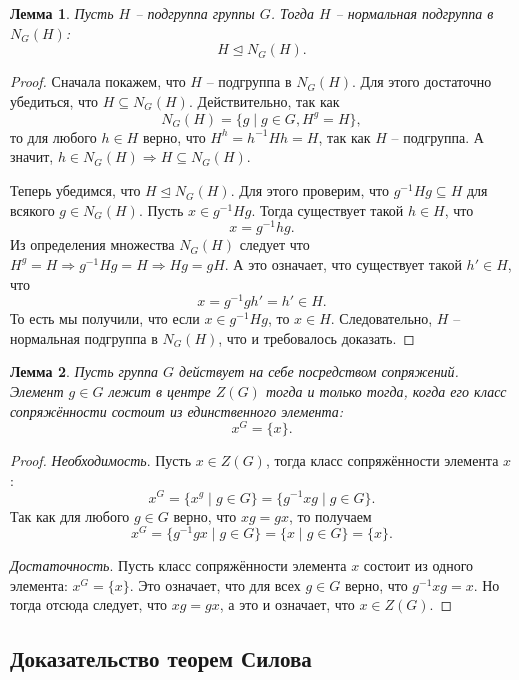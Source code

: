 \documentclass{article}
\newtheorem{lemma}{Лемма}[section]
\begin{document}
\begin{lemma} \label{mtqr}
    Пусть $H$ -- подгруппа группы $G$. Тогда $H$ -- нормальная подгруппа в $N_G(H)$:
    \[
        H \trianglelefteq N_G(H).
    \]
\end{lemma}
\begin{proof}
    Сначала покажем, что $H$ -- подгруппа в $N_G(H)$. Для этого достаточно убедиться, что $H \subseteq N_G(H)$. Действительно, так как $$ N_G(H) = \{ g \mid g \in G, H^g = H \}, $$ то для любого $h \in H$ верно, что $H^h = h^{-1}Hh = H$, так как $H$ -- подгруппа. А значит, $h \in N_G(H) \Rightarrow H \subseteq N_G(H)$.

    Теперь убедимся, что $H \trianglelefteq N_G(H) $. Для этого проверим, что $g^{-1} H g \subseteq H$ для всякого $g \in N_G(H)$. Пусть $x \in g^{-1} H g$. Тогда существует такой $h \in H$, что $$ x = g^{-1} h g. $$ Из определения множества $N_G(H)$ следует что $H^g = H \Rightarrow g^{-1} H g = H \Rightarrow Hg = gH$. А это означает, что существует такой $h' \in H$, что $$ x = g^{-1} g h' = h' \in H. $$
    То есть мы получили, что если $x \in g^{-1} H g$, то $x \in H$. Следовательно, $H$ -- нормальная подгруппа в $N_G(H)$, что и требовалось доказать.
\end{proof}

\begin{lemma} \label{rafik}
    Пусть группа $G$ действует на себе посредством сопряжений. Элемент $g \in G$ лежит в центре $Z(G)$ тогда и только тогда, когда его класс сопряжённости состоит из единственного элемента: $$ x^G = \{ x \}. $$
\end{lemma}
\begin{proof}
    \textit{Необходимость}. Пусть $x \in Z(G)$, тогда класс сопряжённости элемента $x$: $$ x^G = \{ x^g \mid g \in G \} = \{ g^{-1} x g \mid g \in G \}.$$ Так как для любого $g \in G$ верно, что $xg = gx$, то получаем $$ x^G = \{ g^{-1} g x \mid g \in G \} = \{ x \mid g \in G \} = \{ x \}. $$

    \textit{Достаточность}. Пусть класс сопряжённости элемента $x$ состоит из одного элемента: $x^G = \{ x \}$. Это означает, что для всех $g \in G$ верно, что $g^{-1} x g = x$. Но тогда отсюда следует, что $xg = gx$, а это и означает, что $x \in Z(G)$.
\end{proof}

\subsection{Доказательство теорем Силова}
\end{document}
